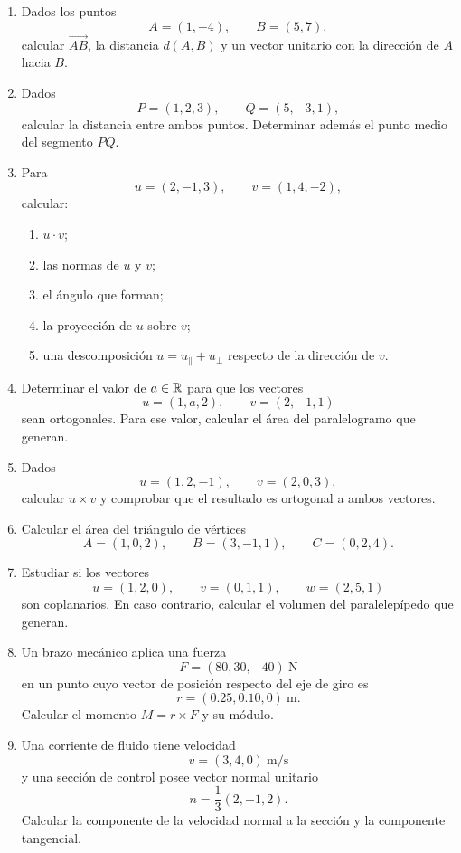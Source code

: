 \begin{enumerate}

\item Dados los puntos
\[
A=(1,-4),\qquad B=(5,7),
\]
calcular $\overrightarrow{AB}$, la distancia $d(A,B)$ y un vector unitario con la dirección de $A$ hacia $B$.

\item Dados
\[
P=(1,2,3),\qquad Q=(5,-3,1),
\]
calcular la distancia entre ambos puntos. Determinar además el punto medio del segmento $PQ$.

\item Para
\[
u=(2,-1,3),\qquad v=(1,4,-2),
\]
calcular:
\begin{enumerate}[label=\alph*)]
\item $u\cdot v$;
\item las normas de $u$ y $v$;
\item el ángulo que forman;
\item la proyección de $u$ sobre $v$;
\item una descomposición $u=u_{\parallel}+u_{\perp}$ respecto de la dirección de $v$.
\end{enumerate}

\item Determinar el valor de $a\in\mathbb{R}$ para que los vectores
\[
u=(1,a,2),\qquad v=(2,-1,1)
\]
sean ortogonales. Para ese valor, calcular el área del paralelogramo que generan.

\item Dados
\[
u=(1,2,-1),\qquad v=(2,0,3),
\]
calcular $u\times v$ y comprobar que el resultado es ortogonal a ambos vectores.

\item Calcular el área del triángulo de vértices
\[
A=(1,0,2),\qquad B=(3,-1,1),\qquad C=(0,2,4).
\]

\item Estudiar si los vectores
\[
u=(1,2,0),\qquad v=(0,1,1),\qquad w=(2,5,1)
\]
son coplanarios. En caso contrario, calcular el volumen del paralelepípedo que generan.

\item Un brazo mecánico aplica una fuerza
\[
F=(80,30,-40)\ \mathrm{N}
\]
en un punto cuyo vector de posición respecto del eje de giro es
\[
r=(0.25,0.10,0)\ \mathrm{m}.
\]
Calcular el momento $M=r\times F$ y su módulo.

\item Una corriente de fluido tiene velocidad
\[
v=(3,4,0)\ \mathrm{m/s}
\]
y una sección de control posee vector normal unitario
\[
n=\frac{1}{3}(2,-1,2).
\]
Calcular la componente de la velocidad normal a la sección y la componente tangencial.


\end{enumerate}

